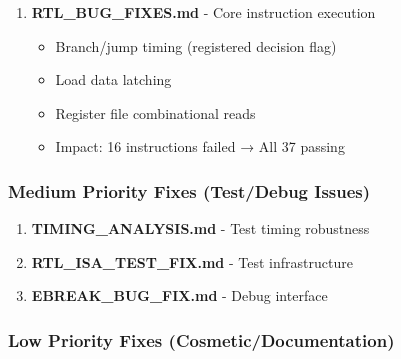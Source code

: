 \begin{record}

\begin{enumerate}
\def\labelenumi{\arabic{enumi}.}
\setcounter{enumi}{1}
\tightlist
\item
  \textbf{RTL\_\allowbreak{}BUG\_\allowbreak{}FIXES.md} - Core
  instruction execution

  \begin{itemize}
  \tightlist
  \item
    Branch/\allowbreak{}jump timing (registered decision flag)
  \item
    Load data latching
  \item
    Register file combinational reads
  \item
    Impact: 16 instructions failed → All 37 passing
  \end{itemize}
\end{enumerate}

\end{record}

\subsubsection{\texorpdfstring{Medium Priority Fixes
(Test/\allowbreak{}Debug
Issues)}{Medium Priority Fixes (Test/Debug Issues)}}\label{cr:fix:fixes-readme:medium-priority-fixes-testdebug-issues}

\begin{record}

\begin{enumerate}
\def\labelenumi{\arabic{enumi}.}
\setcounter{enumi}{2}
\tightlist
\item
  \textbf{TIMING\_\allowbreak{}ANALYSIS.md} - Test timing robustness
\item
  \textbf{RTL\_\allowbreak{}ISA\_\allowbreak{}TEST\_\allowbreak{}FIX.md}
  - Test infrastructure
\item
  \textbf{EBREAK\_\allowbreak{}BUG\_\allowbreak{}FIX.md} - Debug
  interface
\end{enumerate}

\end{record}

\subsubsection{\texorpdfstring{Low Priority Fixes
(Cosmetic/\allowbreak{}Documentation)}{Low Priority Fixes (Cosmetic/Documentation)}}\label{cr:fix:fixes-readme:low-priority-fixes-cosmeticdocumentation}

